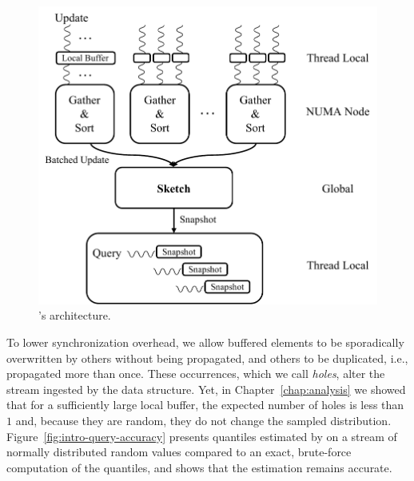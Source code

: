 \begin{figure}[htp]
    \centering
    \hspace{70pt}
        \includegraphics[width=0.8\linewidth,trim={0cm 0cm 0cm 0.1cm},clip]{graphics/algorithm/Quancurrent_structure_intro.pdf}
    \caption{\mysketch's architecture.}
    \label{fig:quancurrentDS}
\end{figure}


To lower synchronization overhead, we allow buffered elements to be sporadically overwritten by others without being propagated, and others to be duplicated, i.e., propagated more than once. These occurrences, which we call \emph{holes}, alter the stream ingested by the data structure. 
Yet, in Chapter~\ref{chap:analysis} we showed that for a sufficiently large local buffer, the expected number of holes is less than $1$ and, because they are random, they do not change the sampled distribution.
Figure~\ref{fig:intro-query-accuracy} presents quantiles estimated by \mysketch on a stream of normally distributed random values compared to an exact, brute-force computation of the quantiles, and shows that the estimation remains accurate.

